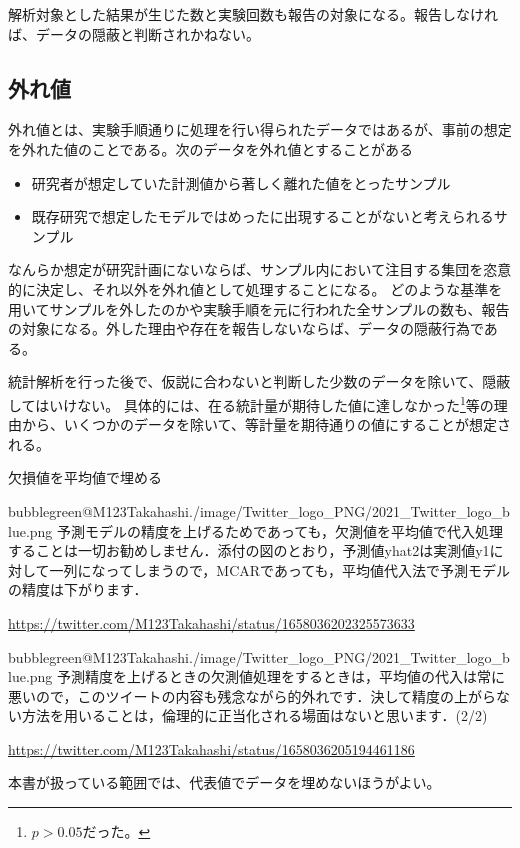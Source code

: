 解析対象とした結果が生じた数と実験回数も報告の対象になる。報告しなければ、データの隠蔽と判断されかねない。


\subsection{外れ値}
外れ値とは、実験手順通りに処理を行い得られたデータではあるが、事前の想定を外れた値のことである。次のデータを外れ値とすることがある
\begin{itemize}
 \item 研究者が想定していた計測値から著しく離れた値をとったサンプル
 \item 既存研究で想定したモデルではめったに出現することがないと考えられるサンプル
\end{itemize}
なんらか想定が研究計画にないならば、サンプル内において注目する集団を恣意的に決定し、それ以外を外れ値として処理することになる。
どのような基準を用いてサンプルを外したのかや実験手順を元に行われた全サンプルの数も、報告の対象になる。外した理由や存在を報告しないならば、データの隠蔽行為である。

統計解析を行った後で、仮説に合わないと判断した少数のデータを除いて、隠蔽してはいけない。
具体的には、在る統計量が期待した値に達しなかった\footnote{$p>0.05$だった。}等の理由から、いくつかのデータを除いて、等計量を期待通りの値にすることが想定される。


\begin{SMbox}{欠損値を平均値で埋める}
 \begin{rightbubbles}{bubblegreen}{@M123Takahashi}{./image/Twitter_logo_PNG/2021_Twitter_logo_blue.png}
  予測モデルの精度を上げるためであっても，欠測値を平均値で代入処理することは一切お勧めしません．添付の図のとおり，予測値yhat2は実測値y1に対して一列になってしまうので，MCARであっても，平均値代入法で予測モデルの精度は下がります．
  \begin{flushright}
   \small	\url{https://twitter.com/M123Takahashi/status/1658036202325573633}
  \end{flushright}
 \end{rightbubbles}

\begin{rightbubbles}{bubblegreen}{@M123Takahashi}{./image/Twitter_logo_PNG/2021_Twitter_logo_blue.png}
  予測精度を上げるときの欠測値処理をするときは，平均値の代入は常に悪いので，このツイートの内容も残念ながら的外れです．決して精度の上がらない方法を用いることは，倫理的に正当化される場面はないと思います．(2/2)
  \begin{flushright}
   \small	\url{https://twitter.com/M123Takahashi/status/1658036205194461186}
  \end{flushright}
 \end{rightbubbles}
 本書が扱っている範囲では、代表値でデータを埋めないほうがよい。
\end{SMbox}




